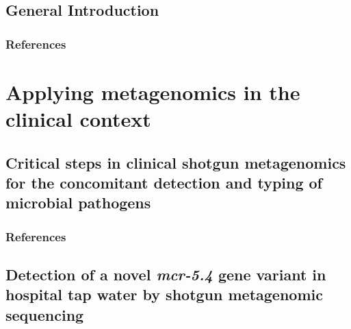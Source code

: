 \documentclass[12pt,a4paper,twoside,openright]{book}
\begin{document}
\begin{sloppy}
\mainmatter

\newpage
\thispagestyle{empty}
\chapter{General Introduction\label{ch:introduction}}
\thispagestyle{empty}
\clearpage \thispagestyle{empty}\mbox{}\clearpage
\newpage
\begin{refsection}

\newpage
\section{References}
\printbibliography[heading=none]
\end{refsection}

\part{Applying metagenomics in the clinical context}
\newpage
\thispagestyle{empty}
\chapter{Critical steps in clinical shotgun metagenomics for the concomitant detection and typing of microbial pathogens\label{ch:paper1}}

\thispagestyle{empty}
\clearpage \thispagestyle{empty}\mbox{}\clearpage
\newpage
\begin{refsection}

\newpage
\section{References}
\printbibliography[heading=none]
\end{refsection}

\newpage
\thispagestyle{empty}
\chapter{Detection of a novel \textit{mcr-5.4} gene variant in hospital tap water by shotgun metagenomic sequencing\label{ch:paper2}}


\end{sloppy}
\end{document}
